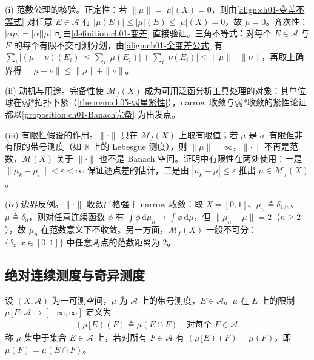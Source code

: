 \documentclass[../../main.tex]{subfiles}%
\begin{document}
\begin{remark}\label{remark:ch01-Banach完备动机}
(i) 范数公理的核验。正定性：若 $\|\mu\|=|\mu|(X)=0$，则由\eqref{align:ch01-变差不等式} 对任意 $E\in\mathcal{A}$ 有 $|\mu(E)|\leqslant|\mu|(E)\leqslant|\mu|(X)=0$，故 $\mu=0$。齐次性：$|\alpha\mu|=|\alpha||\mu|$ 可由\cref{definition:ch01-变差} 直接验证。三角不等式：对每个 $E\in\mathcal{A}$ 与 $E$ 的每个有限不交可测分划，由\eqref{align:ch01-全变差公式} 有 $\sum_i|(\mu+\nu)(E_i)|\leqslant\sum_i|\mu(E_i)|+\sum_i|\nu(E_i)|\leqslant\|\mu\|+\|\nu\|$，再取上确界得 $\|\mu+\nu\|\leqslant\|\mu\|+\|\nu\|$。

(ii) 动机与用途。完备性使 $\mathcal{M}_f(X)$ 成为可用泛函分析工具处理的对象：其单位球在弱*拓扑下紧（\cref{theorem:ch05-弱星紧性}），narrow 收敛与弱*收敛的紧性论证都以\cref{proposition:ch01-Banach完备} 为出发点。

(iii) 有限性假设的作用。$\|\cdot\|$ 只在 $\mathcal{M}_f(X)$ 上取有限值；若 $\mu$ 是 $\sigma$--有限但非有限的带号测度（如 $\mathbb{R}$ 上的 Lebesgue 测度），则 $\|\mu\|=\infty$，$\|\cdot\|$ 不再是范数，$\mathcal{M}(X)$ 关于 $\|\cdot\|$ 也不是 Banach 空间。证明中有限性在两处使用：一是 $\|\mu_k-\mu_l\|<\varepsilon<\infty$ 保证逐点差的估计，二是由 $|\mu_k-\mu|\leqslant\varepsilon$ 推出 $\mu\in\mathcal{M}_f(X)$。

(iv) 边界反例。$\|\cdot\|$ 收敛严格强于 narrow 收敛：取 $X=[0,1]$、$\mu_n\triangleq\delta_{1/n}$、$\mu\triangleq\delta_0$，则对任意连续函数 $\phi$ 有 $\int\phi\,\mathrm{d}\mu_n\to\int\phi\,\mathrm{d}\mu$，但 $\|\mu_n-\mu\|=2$（$n\geqslant2$），故 $\mu_n$ 在范数意义下不收敛。另一方面，$\mathcal{M}_f(X)$ 一般不可分：$\{\delta_x:x\in[0,1]\}$ 中任意两点的范数距离为 $2$。
\end{remark}

\subsection{绝对连续测度与奇异测度}\label{subsection:ch01-绝对连续奇异}

\begin{definition}\label{definition:ch01-集中测度}
设 $(X,\mathcal{A})$ 为一可测空间，$\mu$ 为 $\mathcal{A}$ 上的带号测度，$E\in\mathcal{A}$。$\mu$ 在 $E$ 上的限制 $\mu\lfloor E:\mathcal{A}\to[-\infty,\infty]$ 定义为
\begin{align*}
(\mu\lfloor E)(F)\triangleq\mu(E\cap F)\quad\text{对每个 }F\in\mathcal{A}.
\end{align*}
称 $\mu$ 集中于集合 $E\in\mathcal{A}$ 上，若对所有 $F\in\mathcal{A}$ 有 $(\mu\lfloor E)(F)=\mu(F)$，即 $\mu(F)=\mu(E\cap F)$。
\end{definition}
\end{document}
